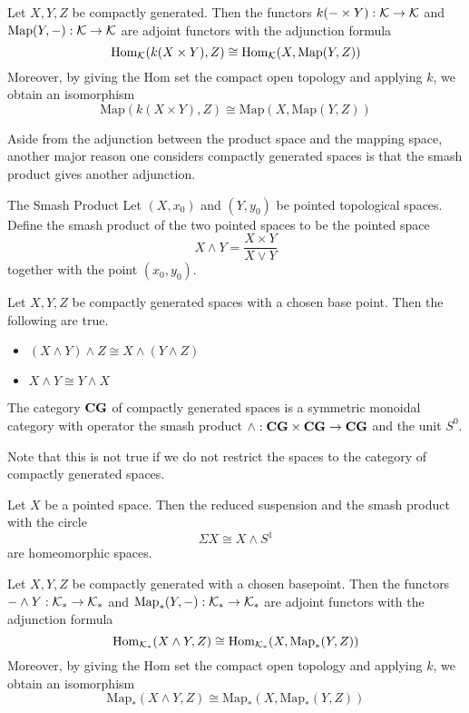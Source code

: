 \documentclass[a4paper]{article}
\begin{document}
\begin{thm}{}{} Let $X,Y,Z$ be compactly generated. Then the functors $k(-\times Y):\mathcal{K}\to\mathcal{K}$ and $\text{Map}(Y,-):\mathcal{K}\to\mathcal{K}$ are adjoint functors with the adjunction formula $$\operatorname{Hom}_{\mathcal{K}}(k(X\times Y),Z)\cong\operatorname{Hom}_{\mathcal{K}}(X,\text{Map}(Y,Z))$$ Moreover, by giving the Hom set the compact open topology and applying $k$, we obtain an isomorphism $$\text{Map}(k(X\times Y),Z)\cong\text{Map}(X,\text{Map}(Y,Z))$$
\end{thm}

Aside from the adjunction between the product space and the mapping space, another major reason one considers compactly generated spaces is that the smash product gives another adjunction. 

\begin{defn}{The Smash Product}{} Let $(X,x_0)$ and $(Y,y_0)$ be pointed topological spaces. Define the smash product of the two pointed spaces to be the pointed space $$X\wedge Y=\frac{X\times Y}{X\vee Y}$$ together with the point $(x_0,y_0)$. 
\end{defn}

\begin{prp}{}{} Let $X,Y,Z$ be compactly generated spaces with a chosen base point. Then the following are true. 
\begin{itemize}
\item $(X\wedge Y)\wedge Z\cong X\wedge(Y\wedge Z)$
\item $X\wedge Y\cong Y\wedge X$
\end{itemize}
\end{prp}

\begin{thm}{}{} The category $\bold{CG}$ of compactly generated spaces is a symmetric monoidal category with operator the smash product $\wedge:\bold{CG}\times\bold{CG}\to\bold{CG}$ and the unit $S^0$. 
\end{thm}

Note that this is not true if we do not restrict the spaces to the category of compactly generated spaces. 

\begin{lmm}{}{} Let $X$ be a pointed space. Then the reduced suspension and the smash product with the circle $$\Sigma X\cong X\wedge S^1$$ are homeomorphic spaces. 
\end{lmm}

\begin{thm}{}{} Let $X,Y,Z$ be compactly generated with a chosen basepoint. Then the functors $-\wedge Y:\mathcal{K}_\ast\to\mathcal{K}_\ast$ and $\text{Map}_\ast(Y,-):\mathcal{K}_\ast\to\mathcal{K}_\ast$ are adjoint functors with the adjunction formula $$\operatorname{Hom}_{\mathcal{K}_\ast}(X\wedge Y,Z)\cong\operatorname{Hom}_{\mathcal{K}_\ast}(X,\text{Map}_\ast(Y,Z))$$ Moreover, by giving the Hom set the compact open topology and applying $k$, we obtain an isomorphism $$\text{Map}_\ast(X\wedge Y,Z)\cong\text{Map}_\ast(X,\text{Map}_\ast(Y,Z))$$
\end{thm}
\end{document}
